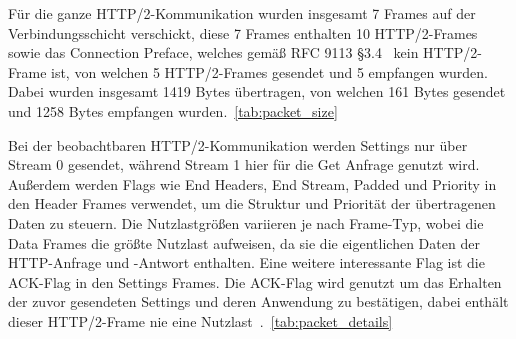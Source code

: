 \FloatBarrier{}

Für die ganze HTTP/2-Kommunikation wurden insgesamt 7 Frames auf der Verbindungsschicht verschickt, diese 7 Frames enthalten 10 HTTP/2-Frames sowie das Connection Preface, welches gemäß RFC 9113 §3.4~\cite{rfc9113_http2_headers} kein HTTP/2-Frame ist, von welchen 5 HTTP/2-Frames gesendet und 5 empfangen wurden.
Dabei wurden insgesamt 1419 Bytes übertragen, von welchen 161 Bytes gesendet und 1258 Bytes empfangen wurden.~\ref{tab:packet_size}

Bei der beobachtbaren HTTP/2-Kommunikation werden Settings nur über Stream 0 gesendet, während Stream 1 hier für die Get Anfrage genutzt wird.
Außerdem werden Flags wie End Headers, End Stream, Padded und Priority in den Header Frames verwendet, um die Struktur und Priorität der übertragenen Daten zu steuern.
Die Nutzlastgrößen variieren je nach Frame-Typ, wobei die Data Frames die größte Nutzlast aufweisen, da sie die eigentlichen Daten der HTTP-Anfrage und -Antwort enthalten.
Eine weitere interessante Flag ist die ACK-Flag in den Settings Frames. Die ACK-Flag wird genutzt um das Erhalten der zuvor gesendeten Settings und deren Anwendung zu bestätigen, dabei enthält dieser HTTP/2-Frame nie eine Nutzlast~\cite{rfc9113_http2_headers}.~\ref{tab:packet_details}


